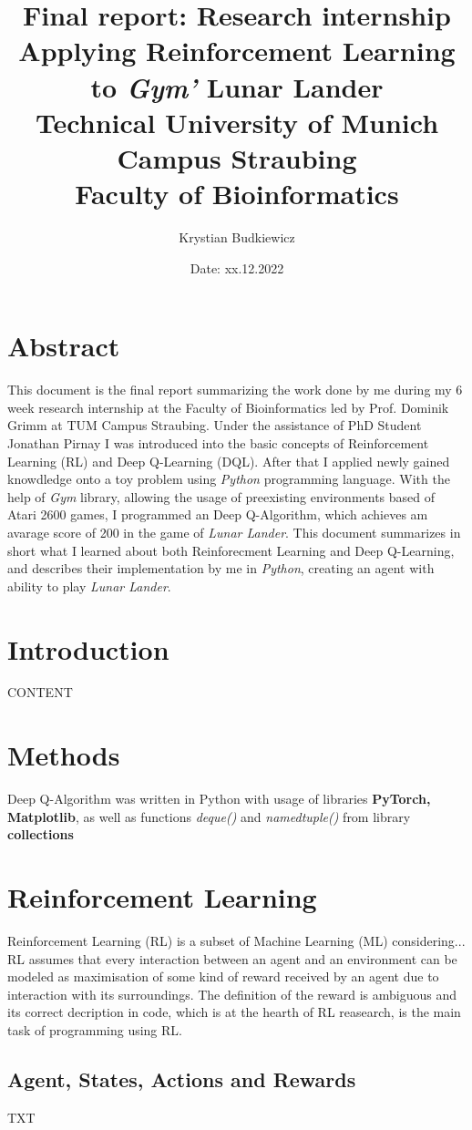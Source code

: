 \documentclass{article}
\title{\textbf{\huge Final report: Research internship \\ Applying Reinforcement Learning to \textit{Gym'} Lunar      Lander}\\
  \vspace{0,25cm}
  \textbf{Technical University of Munich \\ Campus Straubing \\ Faculty of Bioinformatics}}
\author{Krystian Budkiewicz}
\date{Date: xx.12.2022}
\begin{document}
\newpage
\section*{Abstract}
This document is the final report summarizing the work done by me during my 6 week research internship at the Faculty of Bioinformatics led by Prof. Dominik Grimm at TUM Campus Straubing. Under the assistance of PhD Student Jonathan Pirnay I was introduced into the basic concepts of Reinforcement Learning (RL) and Deep Q-Learning (DQL). After that I applied newly gained knowdledge onto a toy problem using \textit{Python} programming language. With the help of \textit{Gym} library, allowing the usage of preexisting environments based of Atari 2600 games, I programmed an Deep Q-Algorithm, which achieves am avarage score of 200 in the game of \textit{Lunar Lander}. This document summarizes in short what I learned about both Reinforecment Learning and Deep Q-Learning, and describes their implementation by me in \textit{Python}, creating  an agent with ability to play \textit{Lunar Lander}.

\newpage
\section*{Introduction}
CONTENT

\section*{Methods}
Deep Q-Algorithm was written in Python with usage of libraries \textbf{PyTorch, Matplotlib}, as well as functions \textit{deque()} and \textit{namedtuple()} from library \textbf{collections}
\pagebreak

\section{Reinforcement Learning}
Reinforcement Learning (RL) is a subset of Machine Learning (ML) considering... \\ RL assumes that every interaction between an agent and an environment can be modeled as maximisation of some kind of reward received by an agent due to interaction with its surroundings. The definition of the reward is ambiguous and its correct decription in code, which is at the hearth of RL reasearch, is the main task of programming using RL.
\subsection{Agent, States, Actions and Rewards}
TXT
\end{document}
